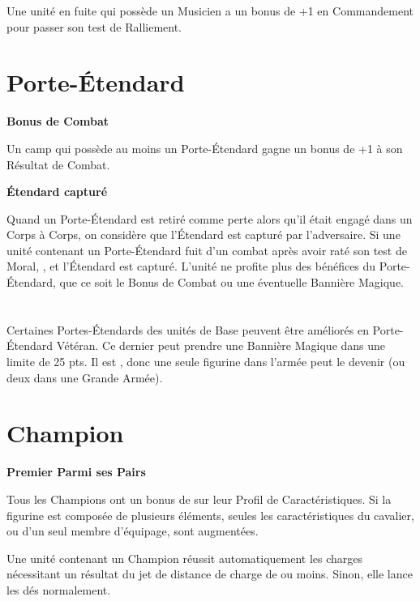 Une unité en fuite qui possède un Musicien a un bonus de +1 en Commandement pour passer son test de Ralliement.

\newpage
\section{Porte-Étendard}

\noindent\textbf{Bonus de Combat}

Un camp qui possède au moins un Porte-Étendard gagne un bonus de +1 à son Résultat de Combat.

\noindent\textbf{Étendard capturé}

Quand un Porte-Étendard est retiré comme perte alors qu'il était engagé dans un Corps à Corps, on considère que l'Étendard est capturé par l'adversaire. Si une unité contenant un Porte-Étendard fuit d'un combat après avoir raté son test de Moral, , et l'Étendard est capturé. L'unité ne profite plus des bénéfices du Porte-Étendard, que ce soit le Bonus de Combat ou une éventuelle Bannière Magique.

\section[Porte-Étendard Vétéran]{}

Certaines Portes-Étendards des unités de Base peuvent être améliorés en Porte-Étendard Vétéran. Ce dernier peut prendre une Bannière Magique dans une limite de 25 pts. Il est \oneofakind{}, donc une seule figurine dans l'armée peut le devenir (ou deux dans une Grande Armée).

\section{Champion}

\noindent\textbf{Premier Parmi ses Pairs}

Tous les Champions ont un bonus de  sur leur Profil de Caractéristiques. Si la figurine est composée de plusieurs éléments, seules les caractéristiques du cavalier, ou d'un seul membre d'équipage, sont augmentées.

\noindent\textbf{}

Une unité contenant un Champion réussit automatiquement les charges nécessitant un résultat du jet de distance de charge de  ou moins. Sinon, elle lance les dés normalement.

